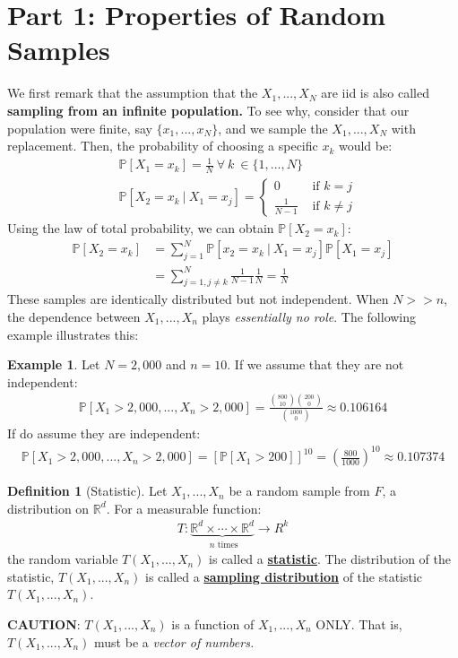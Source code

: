 \documentclass[11pt]{scrartcl}
\newcommand{\R}[0]{\mathbb{R}}
\theoremstyle{definition}
\newtheorem{definition}{Definition}
\newtheorem{ex}{Example}
\theoremstyle{remark}
\newcommand{\dfn}[1]{\textbf{\underline{#1}}}
\newcommand{\pr}[1]{\mathbb{P}[#1]}
\newcommand{\stat}[0]{T(X_1, ..., X_n )}
\begin{document}
{\section{Part 1: Properties of Random Samples}

We first remark that the assumption that the $X_1, ..., X_N$ are iid is also called \textbf{sampling from an infinite population.} To see why, consider that our population were finite, say $\{ x_1, ..., x_N \}$, and we sample the $X_1,..., X_N$ with replacement. Then, the probability of choosing a specific $x_k$ would be: 
\begin{align*}
		& \pr{ X_1 = x_k } = \frac{1}{N}\ \forall\ k\ \in \{ 1, ..., N \} \\
		& \pr{ X_2 = x_k\ |\ X_1 = x_j } = \begin{cases}
			0 & \text{ if } k = j \\
			\frac{1}{N-1} & \text{ if } k \neq j 
		\end{cases} 
\end{align*}
Using the law of total probability, we can obtain $\pr{X_2 = x_k}$: 
\begin{align*}
	\pr{X_2 = x_k } & = \sum_{j=1}^N \pr{x_2 = x_k\ |\ X_1 = x_j } \pr{X_1 = x_j} \\
		& = \sum_{j=1, j \neq k}^N \frac{1}{N-1	} \frac{1}{N} = \frac{1}{N}
\end{align*}
These samples are identically distributed but not independent. When $N >> n $, the dependence between $X_1, ..., X_n$ plays \emph{essentially no role}. The following example illustrates this: 

\begin{ex} 
Let $N=2,000$ and $n=10$. If we assume that they are not independent: 
\begin{align*}
\pr{X_1 > 2,000 , ... , X_n > 2,000}  =	\frac{\binom{800}{10} \binom{200}{0}}{\binom{1000}{0}} \approx 0.106164 
\end{align*}
If do assume they are independent: 
\begin{align*}
\pr{X_1 > 2,000 , ... , X_n > 2,000} = [\pr{X_1 > 200}]^{10} =  \left( \frac{800}{1000} \right)^{10} \approx 0.107374 	
\end{align*}
\end{ex}

\begin{definition}[Statistic]
	Let $X_1, ..., X_n$ be a random sample from $F$, a distribution on $\R^d$. For a measurable function: 
	\begin{align}
		T: \underbrace{\R^d \times \cdots \times \R^d}_{\text{ $n$ times } } \rightarrow R^k 
	\end{align}
	the random variable $T(X_1, ..., X_n)$ is called a \dfn{statistic}. The distribution of the statistic, $T(X_1,...,X_n)$ is called a \dfn{sampling distribution} of the statistic $\stat$. 
\end{definition}
\textbf{CAUTION}: $\stat$ is a function of $X_1, ..., X_n$ ONLY. That is, $\stat$ must be a \emph{vector of numbers.} 

}
\end{document}
